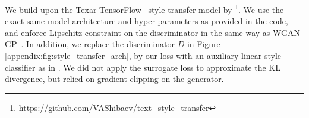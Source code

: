 \documentclass{article}
\newcommand{\0}{\bm{0}}
\begin{document}
We build upon the Texar-TensorFlow~\cite{texar} style-transfer model by \citet{tikhonov2019style}\footnote{\href{https://github.com/VAShibaev/text_style_transfer}{https://github.com/VAShibaev/text\_style\_transfer}}. We use the exact same model architecture and hyper-parameters as provided in the code, and enforce Lipschitz constraint on the discriminator in the same way as WGAN-GP~\cite{WGAN}. In addition, we replace the discriminator $D$ in Figure \ref{appendix:fig:style_transfer_arch}, by our loss with an auxiliary linear style classifier as in \citet{ACGAN}. We did not apply the surrogate loss to approximate the KL divergence, but relied on gradient clipping on the generator.


 
\end{document}
